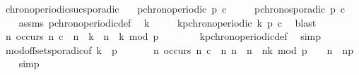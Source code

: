 \begin{isabellebody}
\isanewline
{}\isamarkupfalse%
\ chrono{\isacharunderscore}periodic{\isacharunderscore}suc{\isacharunderscore}sporadic{\isacharcolon}\isanewline
\ \ \ {\isacartoucheopen}p{\isacharunderscore}chronoperiodic\ {\isacharparenleft}p{\isacharplus}{}{\isacharparenright}\ c{\isacartoucheclose}\isanewline
\ \ \ \ \ {\isacartoucheopen}p{\isacharunderscore}chronosporadic\ p\ c{\isacartoucheclose}\isanewline
%
\isadelimproof
%
\endisadelimproof
%
\isatagproof
{}\isamarkupfalse%
\ {\isacharminus}\isanewline
\ \ \isamarkupfalse%
\ assms\ p{\isacharunderscore}chronoperiodic{\isacharunderscore}def\ \isamarkupfalse%
\ k\isanewline
\ \ \ \ \ {\isacartoucheopen}kp{\isacharunderscore}chronoperiodic\ k\ {\isacharparenleft}p{\isacharplus}{}{\isacharparenright}\ c{\isacartoucheclose}\ \isamarkupfalse%
\ blast\isanewline
\ \ \isamarkupfalse%
\ {\isacharasterisk}{\isacharcolon}{\isacartoucheopen}{\isasymforall}n{\isachardot}\ occurs\ n\ c\ {\isacharequal}\ {\isacharparenleft}{\isacharparenleft}n\ {\isasymge}\ k{\isacharparenright}\ {\isasymand}\ {\isacharparenleft}{\isacharparenleft}n\ {\isacharminus}\ k{\isacharparenright}\ mod\ {\isacharparenleft}p{\isacharplus}{}{\isacharparenright}\ {\isacharequal}\ {}{\isacharparenright}{\isacharparenright}{\isacartoucheclose}\isanewline
\ \ \ \ \isamarkupfalse%
\ kp{\isacharunderscore}chronoperiodic{\isacharunderscore}def\ \isamarkupfalse%
\ simp\isanewline
\ \ \isamarkupfalse%
\ mod{\isacharunderscore}offset{\isacharunderscore}sporadic{\isacharprime}{\isacharbrackleft}of\ k\ {\isacharunderscore}\ {\isacartoucheopen}p{\isacharplus}{}{\isacartoucheclose}{\isacharbrackright}\ \isamarkupfalse%
\ \isanewline
\ \ \ \ {\isacartoucheopen}{\isasymforall}n{\isachardot}\ occurs\ n\ c\ {\isasymlongrightarrow}\ {\isacharparenleft}{\isasymforall}n{\isacharprime}{\isachardot}\ {\isacharparenleft}n\ {\isacharless}\ n{\isacharprime}\ {\isasymand}\ {\isacharparenleft}{\isacharparenleft}n{\isacharprime}{\isacharminus}k{\isacharparenright}\ mod\ {\isacharparenleft}p{\isacharplus}{}{\isacharparenright}\ {\isacharequal}\ {}{\isacharparenright}{\isacharparenright}\ {\isasymlongrightarrow}\ n{\isacharprime}\ {\isasymge}\ n{\isacharplus}p{\isacharplus}{}{\isacharparenright}{\isacartoucheclose}\isanewline
\ \ \isamarkupfalse%
\ simp\isanewline

\end{isabellebody}

